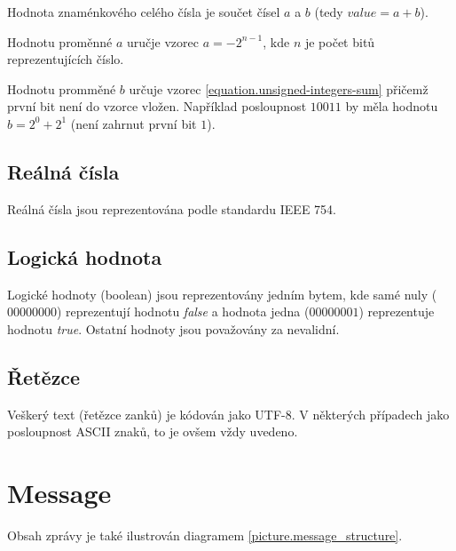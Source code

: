 \documentclass[12pt,oneside,a4paper]{report}
\begin{document}
Hodnota znaménkového celého čísla je součet čísel $a$ a $b$ (tedy ${value} = a + b$). 

Hodnotu proměnné $a$ uručje vzorec $a = -2^{n - 1}$, kde $n$ je počet bitů reprezentujících číslo.

Hodnotu promměné $b$ určuje vzorec \ref{equation.unsigned-integers-sum} přičemž první bit není do vzorce vložen. Například posloupnost $10011$ by měla hodnotu $b = 2^0 + 2^1$ (není zahrnut první bit $1$). 

\subsection{Reálná čísla}

Reálná čísla jsou reprezentována podle standardu IEEE 754.

\subsection{Logická hodnota} 

Logické hodnoty (boolean) jsou reprezentovány jedním bytem, kde samé nuly ($00000000$) reprezentují hodnotu \emph{false} a hodnota jedna ($00000001$) reprezentuje hodnotu \emph{true}. Ostatní hodnoty jsou považovány za nevalidní.

\subsection{Řetězce}

Veškerý text (řetězce zanků) je kódován jako UTF-8. V některých případech jako posloupnost ASCII znaků, to je ovšem vždy uvedeno.

\section{Message}


Obsah zprávy je také ilustrován diagramem \ref{picture.message_structure}.
\end{document}
